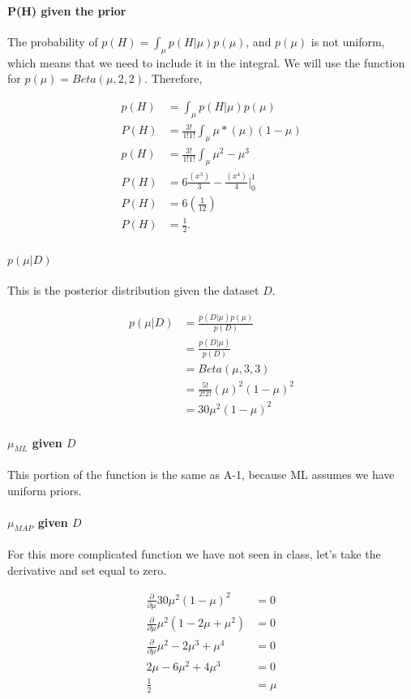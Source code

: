 \documentclass[paper=a4, fontsize=11pt]{scrartcl} %
\begin{document}
\paragraph{P(H) given the prior}
The probability of $p(H) = \int_{\mu} p(H|\mu)p(\mu)$, and $p(\mu)$ is not uniform, which means that we need to include it in the integral.  We will use the function for $p(\mu) =  Beta(\mu,2,2)$. Therefore, 

\begin{align}
p(H) &= \int_{\mu} p(H|\mu)p(\mu) \\
P(H) &= \frac{3!}{1!1!}\int_{\mu} \mu*(\mu)(1-\mu) \\
p(H) &=  \frac{3!}{1!1!} \int_{\mu} \mu^2-\mu^3 \\
P(H) &= 6 \frac{(x^3)}{3} - \frac{(x^4)}{4} |^1_0 \\
P(H) &= 6 (\frac{1}{12}) \\
P(H) &= \frac{1}{2}. \\
\end{align}

\paragraph{$p(\mu|D)$}
This is the posterior distribution given the dataset $D$.

\begin{align}
p(\mu|D) &= \frac{p(D|\mu)p(\mu)}{p(D)} \\
&= \frac{p(D|\mu)}{p(D)} \\
&= Beta(\mu,3,3) \\
&= \frac{5!}{2!2!}(\mu)^2(1-\mu)^2 \\
& = 30 \mu^2(1-\mu)^2
\end{align}

\paragraph{$\mu_{ML}$ given $D$}
This portion of the function is the same as A-1, because ML assumes we have uniform priors.

\paragraph{$\mu_{MAP}$ given $D$}
For this more complicated function we have not seen in class, let's take the derivative and set equal to zero.

\begin{align}
\frac{\partial}{\partial \mu} 30 \mu^2(1-\mu)^2 &= 0 \\
\frac{\partial}{\partial \mu} \mu^2 (1 -2\mu + \mu^2) &= 0 \\
\frac{\partial}{\partial \mu} \mu^2 -2 \mu^3 + \mu^4 &= 0 \\
2\mu -6\mu^2 + 4\mu^3 &= 0 \\
\frac{1}{2} &= \mu \\
\end{align}
\end{document}
